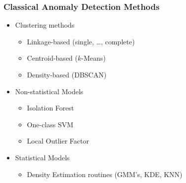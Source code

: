 \documentclass[aspectratio=169,10pt]{beamer}
\begin{document}
\begin{frame}
  \frametitle{Classical Anomaly Detection Methods}
  \label{ndpg:anomalymethods}
  \begin{itemize}
    \item Clustering methods
      \begin{itemize}
        \item Linkage-based (single, \dots, complete)~\citep{ackerman2010}
        \item Centroid-based ($k$-Means)~\citep{hartigan1979} 
        \item Density-based (DBSCAN)~\citep{ester1996}
      \end{itemize}
    \item Non-statistical Models
      \begin{itemize}
        \item Isolation Forest~\citep{liu2000}
        \item One-class SVM~\citep{chang2011}
        \item Local Outlier Factor~\citep{breunig2000}
      \end{itemize}
    \item Statistical Models
      \begin{itemize}
        \item Density Estimation routines (GMM's, KDE, KNN)
      \end{itemize}
  \end{itemize}
  \hyperlink{ndpg:anomaly}{}
\end{frame} %
\end{document}
